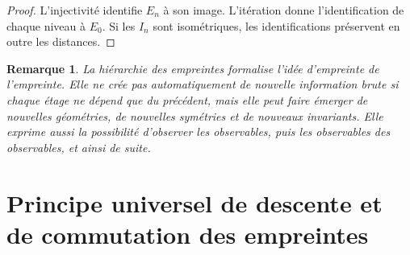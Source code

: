 \documentclass[11pt,a4paper,openany]{book}
\newtheorem{remark}[definition]{Remarque}
\begin{document}
\begin{proof}
L'injectivité identifie \(E_n\) à son image. L'itération donne l'identification de chaque niveau à \(E_0\). Si les \(I_n\) sont isométriques, les identifications préservent en outre les distances.
\end{proof}

\begin{remark}
La hiérarchie des empreintes formalise l'idée d'empreinte de l'empreinte. Elle ne crée pas automatiquement de nouvelle information brute si chaque étage ne dépend que du précédent, mais elle peut faire émerger de nouvelles géométries, de nouvelles symétries et de nouveaux invariants. Elle exprime aussi la possibilité d'observer les observables, puis les observables des observables, et ainsi de suite.
\end{remark}

%












%



\section{Principe universel de descente et de commutation des empreintes}
\end{document}
